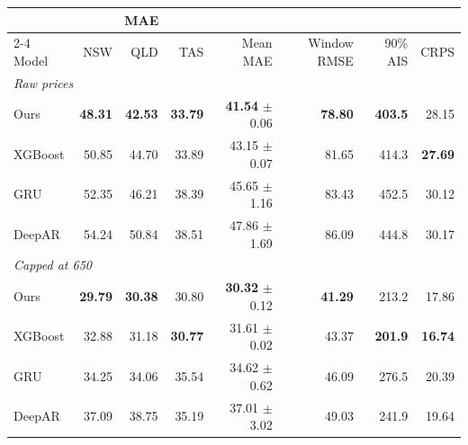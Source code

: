\begin{tabular}{lrrrrrrr}
\toprule
& \multicolumn{3}{c}{MAE} & & & & \\
\cmidrule(lr){2-4}
Model & NSW & QLD & TAS & Mean MAE & Window RMSE & 90\% AIS & CRPS \\
\midrule
\multicolumn{8}{l}{\emph{Raw prices}} \\
Ours & \textbf{48.31} & \textbf{42.53} & \textbf{33.79} & \textbf{41.54} $\pm$ 0.06 & \textbf{78.80} & \textbf{403.5} & 28.15 \\
XGBoost & 50.85 & 44.70 & 33.89 & 43.15 $\pm$ 0.07 & 81.65 & 414.3 & \textbf{27.69} \\
GRU & 52.35 & 46.21 & 38.39 & 45.65 $\pm$ 1.16 & 83.43 & 452.5 & 30.12 \\
DeepAR & 54.24 & 50.84 & 38.51 & 47.86 $\pm$ 1.69 & 86.09 & 444.8 & 30.17 \\
\midrule
\multicolumn{8}{l}{\emph{Capped at 650}} \\
Ours & \textbf{29.79} & \textbf{30.38} & 30.80 & \textbf{30.32} $\pm$ 0.12 & \textbf{41.29} & 213.2 & 17.86 \\
XGBoost & 32.88 & 31.18 & \textbf{30.77} & 31.61 $\pm$ 0.02 & 43.37 & \textbf{201.9} & \textbf{16.74} \\
GRU & 34.25 & 34.06 & 35.54 & 34.62 $\pm$ 0.62 & 46.09 & 276.5 & 20.39 \\
DeepAR & 37.09 & 38.75 & 35.19 & 37.01 $\pm$ 3.02 & 49.03 & 241.9 & 19.64 \\
\bottomrule
\end{tabular}
